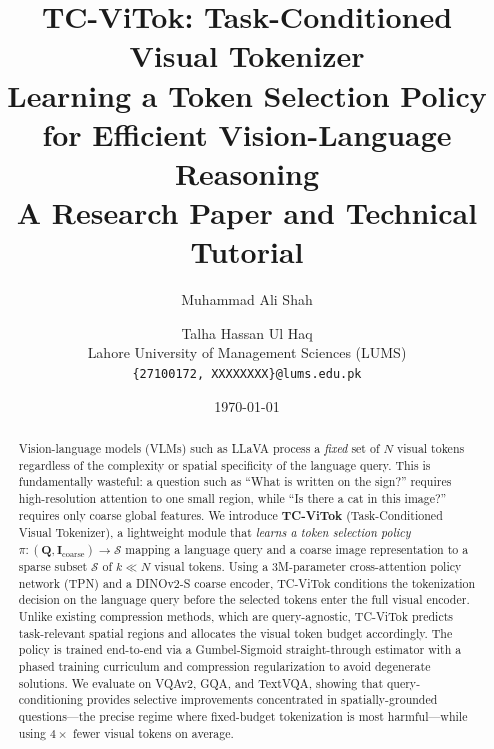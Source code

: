 \documentclass[12pt,a4paper]{article}
\newcommand{\mI}{\mathbf{I}}     %
\newcommand{\mQ}{\mathbf{Q}}     %
\begin{document}

\title{
  \textbf{TC-ViTok: Task-Conditioned Visual Tokenizer} \\
  \large Learning a Token Selection Policy for Efficient Vision-Language Reasoning \\[0.5em]
  \normalsize A Research Paper and Technical Tutorial
}

\author{
  Muhammad Ali Shah \and Talha Hassan Ul Haq \\[0.3em]
  Lahore University of Management Sciences (LUMS) \\
  \texttt{\{27100172, XXXXXXXX\}@lums.edu.pk}
}

\date{\today}

\maketitle
\thispagestyle{empty}

\begin{abstract}

Vision-language models (VLMs) such as LLaVA process a \emph{fixed} set of $N$
visual tokens regardless of the complexity or spatial specificity of the language
query. This is fundamentally wasteful: a question such as ``What is written on
the sign?'' requires high-resolution attention to one small region, while ``Is
there a cat in this image?'' requires only coarse global features. We introduce
\textbf{TC-ViTok} (Task-Conditioned Visual Tokenizer), a lightweight module that
\emph{learns a token selection policy} $\pi\colon (\mQ, \mI_{\mathrm{coarse}})
\to \mathcal{S}$ mapping a language query and a coarse image representation to a
sparse subset $\mathcal{S}$ of $k \ll N$ visual tokens. Using a 3M-parameter
cross-attention policy network (TPN) and a DINOv2-S coarse encoder, TC-ViTok
conditions the tokenization decision on the language query before the selected
tokens enter the full visual encoder. Unlike existing compression methods, which
are query-agnostic, TC-ViTok predicts task-relevant spatial regions and allocates
the visual token budget accordingly. The policy is trained end-to-end via a
Gumbel-Sigmoid straight-through estimator with a phased training curriculum and
compression regularization to avoid degenerate solutions. We evaluate on VQAv2,
GQA, and TextVQA, showing that query-conditioning provides selective improvements
concentrated in spatially-grounded questions---the precise regime where fixed-budget
tokenization is most harmful---while using $4\times$ fewer visual tokens on average.

\end{abstract}
\end{document}
